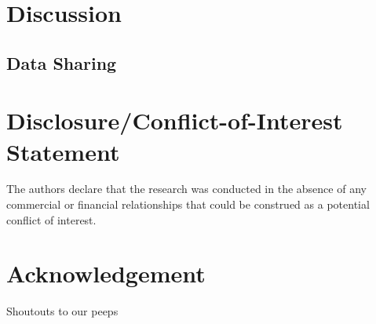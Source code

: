 \documentclass{frontiersSCNS} %
\begin{document}

\section{Discussion}

\subsection{Data Sharing}

\section*{Disclosure/Conflict-of-Interest Statement}
The authors declare that the research was conducted in the absence of any commercial or financial relationships that could be construed as a potential conflict of interest.

\section*{Acknowledgement}
Shoutouts to our peeps
\end{document}
